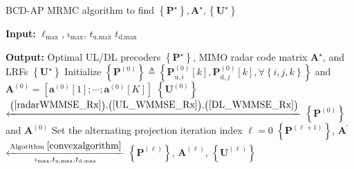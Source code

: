 \documentclass[10pt,journal]{IEEEtran}
\newcommand{\paren}[1]{\left({#1}\right)}
\newcommand{\bracket}[1]{{\left [{#1}\right ]}}
\newcommand{\braces}[1]{{\left\{ {#1}\right\}}}
\newcommand{\rr}{_\mathrm{r}}
\newcommand{\B}{\textrm{B}}
\newcommand{\rnr}{_{\mathrm{r},n_\mathrm{r}}}
\newcommand{\HrB}{\mathbf{H}_{\textrm{rB}}}
\newcommand{\Hrj}{\mathbf{H}_{\textrm{r},j}}
\newcommand{\HBj}{\mathbf{H}_{\textrm{B},j}}
\newcommand{\HiB}{\mathbf{H}_{i,\textrm{B}}}
\theoremstyle{definition}
\begin{document}
	\begin{algorithm}[ht!]
		\par\noindent\small
	    \caption{BCD-AP MRMC algorithm to find $\braces{\mathbf{P}^\star},\mathbf{A}^\star,\braces{\mathbf{U}^\star}$}
		\label{Alternating_sum}
		\begin{algorithmic}[1]
			\Statex \textbf{Input:} $\mathrm{\ell}_{\textrm{max}}$, $\mathrm{\iota}_{\textrm{max}}$, $t_{\textrm{u,max}}$ $t_{\textrm{d,max}}$
			
			\Statex \textbf{Output:} Optimal UL/DL precoders $\braces{\mathbf{P}^\star}$, MIMO radar code matrix $\mathbf{A}^\star$, and LRFs $\braces{\mathbf{U}^\star}$
			\State Initialize $\braces{\mathbf{P}^{\paren{\mathrm{0}}}}\triangleq
			\braces{\mathbf{P}^{\paren{\mathrm{0}}}_{\textrm{u},i}\bracket{k},\mathbf{P}^{\paren{\mathrm{0}}}_{\textrm{d},j}\bracket{k}, \forall \braces{i,j,k}}$ and $\mathbf{A}^{\paren{\mathrm{0}}}=\bracket{\mathbf{a}^{\paren{\mathrm{0}}}\bracket{1};\cdots;\mathbf{a}^{\paren{\mathrm{0}}}\bracket{\mathrm{\mathit{K}}}}$
			\State %
			$\braces{\mathbf{U}^{\paren{\mathrm{0}}}}$ $\xleftarrow{\mathrm{\paren{\ref{radarWMMSE_Rx}}},\mathrm{\paren{\ref{UL_WMMSE_Rx}}},\mathrm{\paren{\ref{DL_WMMSE_Rx}}}}$  $\braces{\mathbf{P}^{\paren{\mathrm{0}}}}$ and $\mathbf{A}^{\paren{\mathrm{0}}}$ 
			\State Set the alternating projection iteration index $\mathrm{\ell=0}$
			\Repeat \; 
			\State $\braces{\mathbf{P}^{\paren{\mathrm{\ell+1}}}}$, $\mathbf{A}^\prime$ $\xleftarrow[\mathrm{\iota}_{\textrm{max}},t_{\textrm{u,max}},t_{\textrm{d,max}}]{\textrm{Algorithm }\ref{convexalgorithm}}$ $\braces{\mathbf{P}^{\paren{\mathrm{\ell}}}}$, $\mathbf{A}^{\paren{\mathrm{\ell}}}$, $\braces{\mathbf{U}^{\paren{\mathrm{\ell}}}}$  %

\end{algorithmic}
\end{algorithm}
\end{document}
